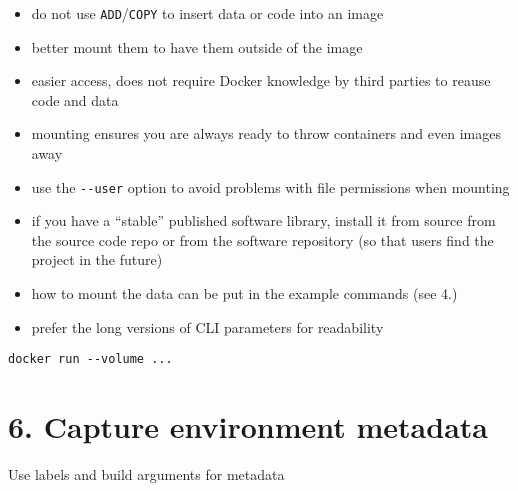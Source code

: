 \documentclass[10pt,letterpaper]{article}
\providecommand{\tightlist}{%
  \setlength{\itemsep}{0pt}\setlength{\parskip}{0pt}}
\begin{document}
\begin{itemize}
\tightlist
\item
  do not use \texttt{ADD}/\texttt{COPY} to insert data or code into an
  image
\item
  better mount them to have them outside of the image
\item
  easier access, does not require Docker knowledge by third parties to
  reause code and data
\item
  mounting ensures you are always ready to throw containers and even
  images away
\item
  use the \texttt{-\/-user} option to avoid problems with file
  permissions when mounting
\item
  if you have a ``stable'' published software library, install it from
  source from the source code repo or from the software repository (so
  that users find the project in the future)
\item
  how to mount the data can be put in the example commands (see 4.)
\item
  prefer the long versions of CLI parameters for readability
\end{itemize}

\begin{verbatim}
docker run --volume ...
\end{verbatim}

\hypertarget{capture-environment-metadata}{%
\section*{6. Capture environment
metadata}\label{capture-environment-metadata}}

Use labels and build arguments for metadata
\end{document}
